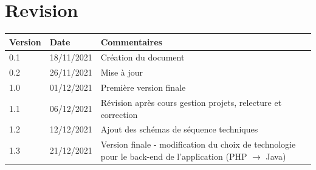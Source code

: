 \documentclass[a4paper, twoside, 12pt]{report}
\title{\titleOfDoc}
\author{\authors}
\begin{document}


\chapter*{Revision}
\begin{table}[!ht] %
	\begin{tabular}{ | m{3cm} | m{3cm}| m{8cm} | } 
		\hline
		\textbf{Version} & \textbf{Date} & \textbf{Commentaires} \\
		\hline
			0.1 & 18/11/2021 & Création du document\\
		\hline
			0.2 & 26/11/2021 & Mise à jour\\
		\hline
			1.0 & 01/12/2021 & Première version finale \\
		\hline
            1.1 & 06/12/2021 & Révision après cours gestion projets, relecture et correction \\
        \hline
            1.2 & 12/12/2021 & Ajout des schémas de séquence techniques \\
        \hline 
            1.3 & 21/12/2021 & Version finale - modification du choix de technologie pour le
                back-end de l'application (PHP $\rightarrow$ Java) \\
        \hline
	\end{tabular}
\end{table}

\tableofcontents
\newpage



%
%
\printbibliography[title=Réferences externes]
\end{document}
